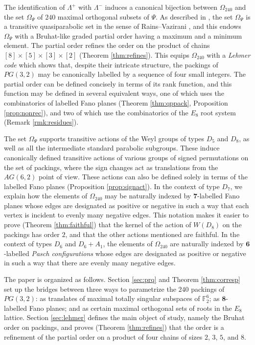 \documentclass{amsart}
\theoremstyle{plain}
\theoremstyle{definition}
\theoremstyle{remark}
\numberwithin{equation}{section}
\newcommand{\F}{{\mathbb F}}
\newcommand{\six}{{\mathbf 6}}
\newcommand{\seven}{{\mathbf 7}}
\newcommand{\eight}{{\mathbf 8}}
\newcommand{\qpx}{\Omega_{240}}
\newcommand{\qp}{\Omega}
\newcommand{\lamp}{\Lambda^+}
\newcommand{\lamm}{\Lambda^-}
\begin{document}
The identification of $\lamp$ with $\lamm$ induces a canonical bijection between $\qpx$ and the set 
$\qp_\Psi$ of $240$ maximal orthogonal subsets of $\Psi$. As described in \cite[\S6.3]{gx5},
the set $\qp_\Psi$ is a transitive quasiparabolic set in the sense of Rains--Vazirani \cite{rains13}, and this endows
$\qp_\Psi$ with a Bruhat-like graded partial order having a maximum and a minimum element. The partial order refines 
the order on the product of chains $[8]\times[5]\times[3]\times[2]$ (Theorem \ref{thm:refines}). This equips $\qpx$ with a
{\it Lehmer code} which shows that, despite their intricate structure, the packings of $PG(3,2)$ may be canonically 
labelled by a sequence of four small integers. The partial order can be defined concisely in terms of its rank function,
and this function may be defined in several equivalent ways, one of which uses the combinatorics of labelled Fano planes 
(Theorem \ref{thm:qppack}, Proposition \ref{prop:nonrec}), and two of which use the combinatorics of the $E_8$ root 
system (Remark \ref{rmk:residues}).

The set $\qp_\Psi$ supports transitive actions of the Weyl groups of types $D_5$ and $D_8$, as well as 
all the intermediate standard parabolic subgroups.
These induce canonically defined transitive actions of various groups of signed permutations on the set of
packings, where the sign changes act as translations from the $AG(6, 2)$ point of view. These actions can also be
defined solely in terms of the labelled Fano planes (Proposition \ref{prop:signact}). In the context of type $D_7$, 
we explain how the elements of $\qpx$ may be naturally indexed by $\seven$-labelled Fano planes whose edges are 
designated as positive or negative in such a way that each vertex is incident to evenly many negative edges. This 
notation makes it easier to prove (Theorem \ref{thm:faithful}) that the kernel of the action of $W(D_8)$ on the 
packings has order $2$, and that the other actions mentioned are faithful. In the context of types $D_6$ and 
$D_6 + A_1$, the elements of $\qpx$ are naturally indexed by $\six$-labelled {\it Pasch configurations} whose 
edges are designated as positive or negative in such a way that there are evenly many negative edges.

The paper is organized as follows. Section \ref{sec:prq} and Theorem \ref{thm:corresp} set up the bridges between 
three ways to parametrize the $240$ packings of $PG(3, 2)$: as translates of maximal totally singular subspaces 
of $\F_2^6$; as $\eight$-labelled Fano planes; and as certain maximal orthogonal sets of roots in the $E_8$ lattice. 
Section \ref{sec:lehmer} defines the main object of study, namely the Bruhat order on packings, and proves
(Theorem \ref{thm:refines}) that the order is a refinement of the partial order on a product of four chains
of sizes $2$, $3$, $5$, and $8$.
\end{document}
